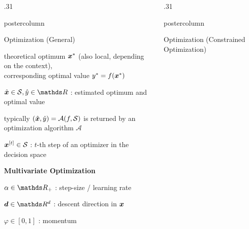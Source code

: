 \documentclass[11pt,compress,t,notes=noshow, xcolor=table]{beamer}
\newlength{\columnheight} %
\begin{document}
\begin{frame}[fragile]{}
\begin{columns}
\begin{column}{.31\textwidth}
\begin{beamercolorbox}[center]{postercolumn}
\begin{minipage}{.98\textwidth}
{\begin{myblock}{Optimization (General)}
\begin{codebox}
						\end{codebox}
						\hspace*{1ex} theoretical optimum $\bm{x}^\ast$ (also local, depending on the context), \\
                        \hspace*{1ex} corresponding optimal value $y^\ast = f(\bm{x}^\ast)$ \\
						\begin{codebox}
							 $\hat\xv \in \mathcal{S}, \hat y \in \R$ : estimated optimum and optimal value
						\end{codebox}
						\hspace*{1ex} typically $(\hat{\bm{x}}, \hat y) = \mathcal{A}(f,\mathcal{S})$ is returned by an optimization algorithm $\mathcal{A}$ \\
						\begin{codebox}
							 $\bm{x}^{[t]} \in \mathcal{S}$ : $t$-th step of an optimizer in the decision space
						\end{codebox}
						\vspace*{2ex} \textbf{Multivariate Optimization}\\
							\begin{codebox}
								 $\alpha \in \R_+$ : step-size / learning rate
							\end{codebox}
							\hspace*{1ex}
							\begin{codebox}
								 $\bm{d} \in \R^d$ : descent direction in $\bm{x}$
							\end{codebox}
							\hspace*{1ex}
							\begin{codebox}
								 $\varphi \in [0, 1]$ : momentum
							\end{codebox}
						\end{myblock}									
					}
			\end{minipage}
		\end{beamercolorbox}
	\end{column}
	\begin{column}{.31\textwidth}
		\begin{beamercolorbox}[center]{postercolumn}
			\begin{minipage}{.98\textwidth}
				\parbox[t][\columnheight]{\textwidth}{
                    \begin{myblock}{Optimization (Constrained Optimization)}

\end{myblock}}
\end{minipage}
\end{beamercolorbox}
\end{column}
\end{columns}
\end{frame}
\end{document}

